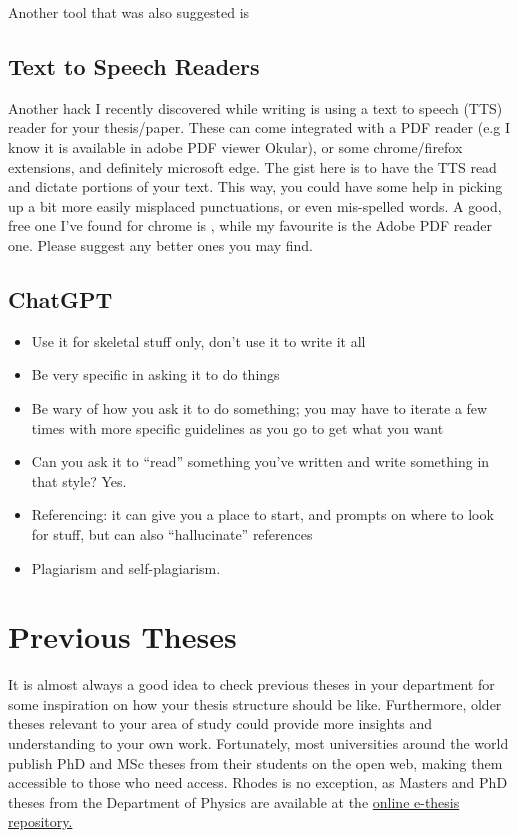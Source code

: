     Another tool that was also suggested is 


\subsection{Text to Speech Readers}
    Another hack I recently discovered while writing is using a text to speech (TTS) reader for your thesis/paper. These can come integrated with a PDF reader (e.g I know it is available in adobe PDF viewer Okular), or some chrome/firefox extensions, and definitely microsoft edge. The gist here is to have the TTS read and dictate portions of your text. This way, you could have some help in picking up a bit more easily misplaced punctuations, or even mis-spelled words. A good, free one I’ve found for chrome is , while my favourite is the Adobe PDF reader one. Please suggest any better ones you may find.


\subsection{ChatGPT}
    \begin{itemize}
        \item Use it for skeletal stuff only, don’t use it to write it all
        \item Be very specific in asking it to do things
        \item Be wary of how you ask it to do something; you may have to iterate a few times with more specific guidelines as you go to get what you want
        \item Can you ask it to ``read'' something you’ve written and write something in that style? Yes.
        \item Referencing: it can give you a place to start, and prompts on where to look for stuff, but can also ``hallucinate'' references
        \item Plagiarism and self-plagiarism.
    \end{itemize}


\section{Previous Theses}
    It is almost always a good idea to check previous theses in your department for some inspiration on how your thesis structure should be like. Furthermore, older theses relevant to your area of study could provide more insights and understanding to your own work. Fortunately, most universities around the world publish PhD and MSc theses from their students on the open web, making them accessible to those who need access. Rhodes is no exception, as Masters and PhD theses from the Department of Physics are available at the \href{http://vital.seals.ac.za:8080/vital/access/manager/Repository?collection=vital%3A42&sort=ss_dateNormalized+desc%2Csort_ss_title+asc&query=&root=vital%3A291}{\textcolor{ratt-primary}{online e-thesis repository.}}

